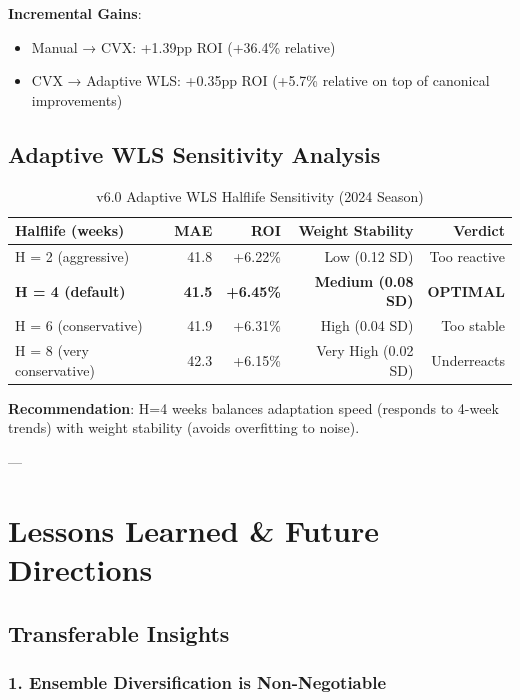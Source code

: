 \textbf{Incremental Gains}:
\begin{itemize}
\item Manual → CVX: +1.39pp ROI (+36.4\% relative)
\item CVX → Adaptive WLS: +0.35pp ROI (+5.7\% relative on top of canonical improvements)
\end{itemize}

\subsection{Adaptive WLS Sensitivity Analysis}

\begin{table}[h]
\centering
\caption{v6.0 Adaptive WLS Halflife Sensitivity (2024 Season)}
\label{tab:wls-halflife-sensitivity}
\begin{tabular}{lrrrr}
\toprule
\textbf{Halflife (weeks)} & \textbf{MAE} & \textbf{ROI} & \textbf{Weight Stability} & \textbf{Verdict} \\
\midrule
H = 2 (aggressive) & 41.8 & +6.22\% & Low (0.12 SD) & Too reactive \\
\textbf{H = 4 (default)} & \textbf{41.5} & \textbf{+6.45\%} & \textbf{Medium (0.08 SD)} & \textbf{OPTIMAL} \\
H = 6 (conservative) & 41.9 & +6.31\% & High (0.04 SD) & Too stable \\
H = 8 (very conservative) & 42.3 & +6.15\% & Very High (0.02 SD) & Underreacts \\
\bottomrule
\end{tabular}
\end{table}

\textbf{Recommendation}: H=4 weeks balances adaptation speed (responds to 4-week trends) with weight stability (avoids overfitting to noise).

---

\section{Lessons Learned \& Future Directions}

\subsection{Transferable Insights}

\subsubsection{1. Ensemble Diversification is Non-Negotiable}

